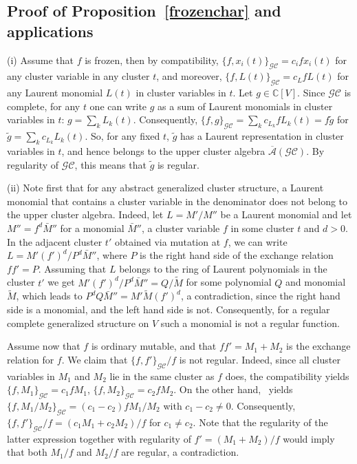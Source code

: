\documentclass{amsart}
\theoremstyle{definition}
\theoremstyle{remark}
\numberwithin{equation}{section}
\numberwithin{theorem}{section}
\def\A{{\mathcal A}}
\def\C{{\mathbb C}}
\def\CC{{\mathcal C}}
\def\G{{\mathcal G}}
\def\UC{\overline{\A}}
\begin{document}
\subsection{Proof of Proposition~\ref{frozenchar} and applications}\label{prooffrozenchar} (i) Assume that $f$ is frozen, then by compatibility, $\{f,x_i(t)\}_{\G\CC}=c_ifx_i(t)$ for any cluster variable in any cluster $t$, and moreover, $\{f,L(t)\}_{\G\CC}=c_LfL(t)$ for any Laurent monomial $L(t)$ in cluster variables in $t$. Let $g\in\C[V]$. Since $\G\CC$ is complete, for any $t$ one can write $g$ as a sum of Laurent monomials
in cluster variables in $t$: $g=\sum_k L_k(t)$. Consequently, $\{f,g\}_{\G\CC}=\sum_k c_{L_k}fL_k(t)=f\tilde g$
for $\tilde g=\sum_k c_{L_k}L_k(t)$. So, for any fixed $t$, $\tilde g$ has a Laurent representation in cluster
variables in $t$, and hence belongs to the upper cluster algebra $\UC(\G\CC)$. By regularity of $\G\CC$, this means
that $\tilde g$ is regular.  

(ii) Note first that for any abstract generalized cluster structure, a Laurent monomial that contains a cluster variable in the denominator does not belong to the upper cluster algebra. Indeed, let $L=M'/M''$ be a Laurent monomial and let $M''=f^d\bar M''$ for a monomial 
$\bar M''$, a cluster variable $f$ in some cluster $t$ and $d>0$. In the adjacent cluster $t'$ obtained via mutation at $f$, we can write 
$L=M'(f')^d/P^d\bar M''$, where $P$ is the right hand side of the exchange relation $ff'=P$. Assuming that $L$ belongs to the ring of Laurent polynomials in the cluster $t'$ we get $M'(f')^d/P^d\bar M''=Q/\tilde M$ for some polynomial $Q$ and monomial $\tilde M$, which
leads to $P^dQ\bar M''=M'\tilde M(f')^d$, a contradiction, since the right hand side is a monomial, and the left hand side is not.  
Consequently, for a regular complete generalized structure on $V$ such a monomial is not a regular function. 

Assume now that $f$ is ordinary mutable, and that $ff'=M_1+M_2$ is the exchange relation for $f$. We claim that
$\{f,f'\}_{\G\CC}/f$ is not regular. Indeed, since all cluster variables in $M_1$ and $M_2$ lie in the same cluster 
as $f$ does, the compatibility yields $\{f,M_1\}_{\G\CC}=c_1fM_1$, $\{f,M_2\}_{\G\CC}=c_2fM_2$. On the other 
hand,~\cite[Theorem 1.4]{GSVb} yields  $\{f,M_1/M_2\}_{\G\CC}=(c_1-c_2)fM_1/M_2$ with $c_1-c_2\ne 0$. Consequently,
$\{f,f'\}_{\G\CC}/f=(c_1M_1+c_2M_2)/f$ for $c_1\ne c_2$. Note that the regularity of the latter expression together
with regularity of $f'=(M_1+M_2)/f$ would imply that both $M_1/f$ and $M_2/f$ are regular, a contradiction. 
\end{document}
